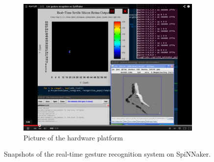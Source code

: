\begin{figure}
\begin{subfigure}[t]{0.84\textwidth}
		\includegraphics[width=\textwidth]{pics/live.png}
		\caption{Picture of the hardware platform}
	    \label{fig:live3}
	\end{subfigure}	

\caption{Snapshots of the real-time gesture recognition system on SpiNNaker.
}
\label{fig:live}
\end{figure}
